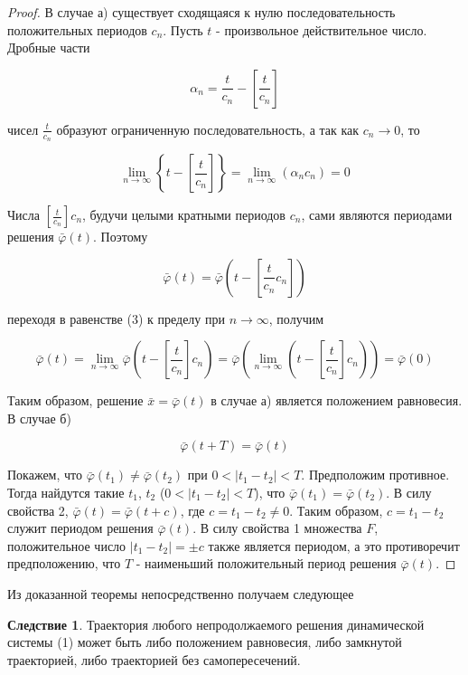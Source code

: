 \documentclass{article}
\theoremstyle{definition} \newtheorem*{theorem*}{Теорема}
\theoremstyle{plain} \newtheorem{theorem}{Теорема}[section]
\theoremstyle{definition} \newtheorem*{corollary*}{Следствие}
\theoremstyle{definition} \newtheorem{corollary}{Следствие}[section]
\begin{document}
\begin{proof}
    В случае а) существует сходящаяся к нулю
    последовательность положительных периодов $c_n$.
    Пусть $t$ - произвольное действительное число.
    Дробные части

    \begin{equation*}
        \alpha_n = \frac{t}{c_n} - \left[ \frac{t}{c_n} \right]
    \end{equation*}

    чисел $\frac{t}{c_n}$ образуют ограниченную
    последовательность, а так как $c_n \rightarrow 0$, то

    \begin{equation*}
        \lim_{n \rightarrow \infty}
        \left\{ t - \left[ \frac{t}{c_n}\right]\right\}
        = \lim_{n \rightarrow \infty} (\alpha_n c_n) = 0
    \end{equation*}

    Числа $\left[ \frac{t}{c_n} \right] c_n$,
    будучи целыми кратными периодов $c_n$,
    сами являются периодами решения $\bar{\varphi}(t)$. Поэтому

    \begin{equation*}
        \bar{\varphi}(t)
        = \bar{\varphi}
        \left( t - \left[\frac{t}{c_n} c_n \right]\right)
    \end{equation*}

    переходя в равенстве (3) к пределу при
    $n \rightarrow \infty$, получим

    \begin{equation*}
        \bar{\varphi}(t)
        = \lim_{n \rightarrow \infty} \bar{\varphi}
        \left( t - \left[\frac{t}{c_n}\right] c_n \right)
        = \bar{\varphi} \left( \lim_{n \rightarrow \infty}
        \left( t - \left[ \frac{t}{c_n} \right] c_n
        \right)\right)
        = \bar{\varphi}(0)
    \end{equation*}

    Таким образом, решение $\bar{x} = \bar{\varphi}(t)$
    в случае а) является положением равновесия.
\\

    В случае б)

    \begin{equation*}
        \bar{\varphi}(t + T) = \bar{\varphi}(t)
    \end{equation*}

    Покажем, что $\bar{\varphi}(t_1) \ne \bar{\varphi}(t_2)$
    при $0 < \vert t_1 - t_2 \vert < T$.
    Предположим противное. Тогда найдутся
    такие $t_1$, $t_2$ ($0 < \vert t_1 - t_2 \vert < T$),
    что $\bar{\varphi}(t_1) = \bar{\varphi}(t_2)$. В силу свойства 2,
    $ \bar{\varphi}(t) = \bar{\varphi}(t + c)$,
    где $c = t_1 - t_2 \ne 0$.
    Таким образом, $c = t_1 - t_2$ служит периодом
    решения $\bar{\varphi}(t)$. В силу свойства 1
    множества $F$, положительное число
    $\vert t_1 - t_2 \vert = \pm c$ также является
    периодом, а это противоречит
    предположению, что $T$ - наименьший положительный
    период решения $\bar{\varphi}(t)$.
\end{proof}

    Из доказанной теоремы непосредственно получаем следующее

    \begin{corollary*}
    Траектория любого непродолжаемого
    решения динамической системы (1) может быть либо
    положением равновесия, либо замкнутой
    траекторией, либо траекторией без самопересечений.
    \end{corollary*}
\end{document}
